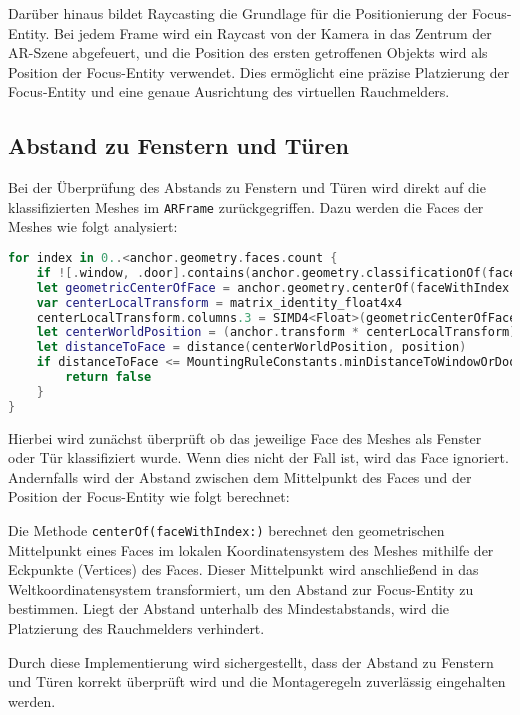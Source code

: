 Darüber hinaus bildet Raycasting die Grundlage für die Positionierung der Focus-Entity. Bei jedem Frame wird ein Raycast von der Kamera in das Zentrum der AR-Szene abgefeuert, und die Position des ersten getroffenen Objekts wird als Position der Focus-Entity verwendet. Dies ermöglicht eine präzise Platzierung der Focus-Entity und eine genaue Ausrichtung des virtuellen Rauchmelders.

\subsection{Abstand zu Fenstern und Türen}

Bei der Überprüfung des Abstands zu Fenstern und Türen wird direkt auf die klassifizierten Meshes im \texttt{ARFrame} zurückgegriffen. Dazu werden die Faces der Meshes wie folgt analysiert: 

\begin{lstlisting}[language=Swift]
for index in 0..<anchor.geometry.faces.count {
    if ![.window, .door].contains(anchor.geometry.classificationOf(faceWithIndex: index)) { continue }
    let geometricCenterOfFace = anchor.geometry.centerOf(faceWithIndex: index)
    var centerLocalTransform = matrix_identity_float4x4
    centerLocalTransform.columns.3 = SIMD4<Float>(geometricCenterOfFace.0, geometricCenterOfFace.1, geometricCenterOfFace.2, 1)
    let centerWorldPosition = (anchor.transform * centerLocalTransform).translation
    let distanceToFace = distance(centerWorldPosition, position)
    if distanceToFace <= MountingRuleConstants.minDistanceToWindowOrDoor {
        return false
    }
}
\end{lstlisting}

Hierbei wird zunächst überprüft ob das jeweilige Face des Meshes als Fenster oder Tür klassifiziert wurde. Wenn dies nicht der Fall ist, wird das Face ignoriert. Andernfalls wird der Abstand zwischen dem Mittelpunkt des Faces und der Position der Focus-Entity wie folgt berechnet:

Die Methode \texttt{centerOf(faceWithIndex:)} berechnet den geometrischen Mittelpunkt eines Faces im lokalen Koordinatensystem des Meshes mithilfe der Eckpunkte (Vertices) des Faces. Dieser Mittelpunkt wird anschließend in das Weltkoordinatensystem transformiert, um den Abstand zur Focus-Entity zu bestimmen. Liegt der Abstand unterhalb des Mindestabstands, wird die Platzierung des Rauchmelders verhindert.

Durch diese Implementierung wird sichergestellt, dass der Abstand zu Fenstern und Türen korrekt überprüft wird und die Montageregeln zuverlässig eingehalten werden.

